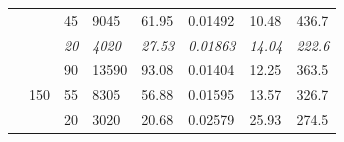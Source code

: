 \documentclass[a4paper, 11pt]{report}
\begin{document}
\begin{table}[ht]
\begin{tabular}{|l|l|l|l|l|l|l|l|}
        \cline{3-8}
                                                                                &                                                                                 & 45                                                                     & 9045                                                                       & 61.95                                                                                            & 0.01492          & 10.48          & 436.7                                                                       \\ 
        \cline{3-8}
                                                                                &                                                                                 & \textit{20}                                                            & \textit{4020}                                                              & \textit{27.53}                                                                                   & \textit{0.01863} & \textit{14.04} & \textit{222.6}                                                              \\ 
        \cline{2-8}
                                                                                & \multirow{3}{*}{150}                                                            & 90                                                                     & 13590                                                                      & 93.08                                                                                            & 0.01404          & 12.25          & 363.5                                                                       \\ 
        \cline{3-8}
                                                                                &                                                                                 & 55                                                                     & 8305                                                                       & 56.88                                                                                            & 0.01595          & 13.57          & 326.7                                                                       \\ 
        \cline{3-8}
                                                                                &                                                                                 & 20                                                                     & 3020                                                                       & 20.68                                                                                            & 0.02579          & 25.93          & 274.5                                                                       \\ 

\end{tabular}
\end{table}
\end{document}
